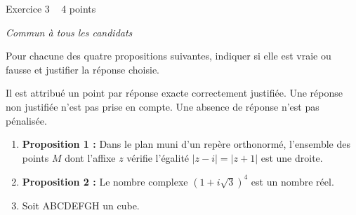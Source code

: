 
%
\begin{h2}Exercice 3   4 points\end{h2}
\textit{Commun à tous les candidats}
\par
Pour chacune des quatre propositions suivantes, indiquer si elle est vraie ou fausse et justifier la réponse choisie.
\par
Il est attribué un point par réponse exacte correctement justifiée. Une réponse non justifiée n'est pas prise en compte. Une absence de réponse n'est pas pénalisée.
\begin{enumerate}
     \item
     \textbf{Proposition 1 :} Dans le plan muni d'un repère orthonormé, l'ensemble des points $M$ dont l'affixe $z$ vérifie l'égalité $|z-i|=|z+1|$ est une droite.
     \item
     \textbf{Proposition 2 :} Le nombre complexe $\left(1+i\sqrt{3}\right)^{4}$ est un nombre réel.
     \item
     Soit ABCDEFGH un cube.
\begin{center}
 \begin{extern}%
\end{extern}
\end{center}
\end{enumerate}
